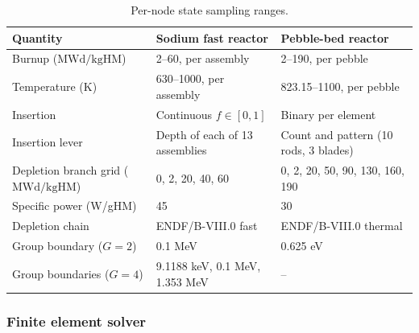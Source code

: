 \documentclass[preprint,12pt]{elsarticle}
\newcommand{\MWdkg}{\mathrm{MWd/kgHM}}
\begin{document}
\begin{table}[htbp]
\centering
\caption{Per-node state sampling ranges.}
\label{tab:sampling}
\begin{tabular}{@{}lll@{}}
\toprule
Quantity & Sodium fast reactor & Pebble-bed reactor \\
\midrule
Burnup ($\MWdkg$)        & 2--60, per assembly   & 2--190, per pebble \\
Temperature (K)          & 630--1000, per assembly & 823.15--1100, per pebble \\
Insertion                & Continuous $f\in[0,1]$ & Binary per element \\
Insertion lever          & Depth of each of 13 assemblies & Count and pattern (10 rods, 3 blades) \\
Depletion branch grid ($\MWdkg$) & 0, 2, 20, 40, 60 & 0, 2, 20, 50, 90, 130, 160, 190 \\
Specific power (W/gHM)   & 45                    & 30 \\
Depletion chain          & ENDF/B-VIII.0 fast    & ENDF/B-VIII.0 thermal \\
Group boundary ($G{=}2$) & 0.1 MeV               & 0.625 eV \\
Group boundaries ($G{=}4$) & 9.1188 keV, 0.1 MeV, 1.353 MeV & -- \\
\bottomrule
\end{tabular}
\end{table}

\subsubsection{Finite element solver}
\label{sec:solver}
\end{document}
